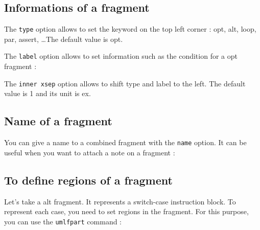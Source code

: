 \documentclass[a4paper,11pt]{report}
\newcommand{\inputTikZ}[1]{%
  }%
\newcommand{\inputTikZ}[1]{%
    \texttt{[image: fig/\#1.pdf]}%
  }%
\begin{document}
\subsection{Informations of a fragment}\label{ss.fraginfos}

The {\tt type} option allows to set the keyword on the top left corner : opt, alt, loop, par, assert, \ldots The default value is opt.

The {\tt label} option allows to set information such as the condition for a opt fragment :

\medskip

\begin{minipage}{0.5\textwidth}

\end{minipage}
\begin{minipage}{0.5\textwidth}
\begin{center}
\inputTikZ{fragmentlabel}
\end{center}
\end{minipage}

\medskip

The {\tt inner xsep} option allows to shift type and label to the left. The default value is 1 and its unit is ex.

\subsection{Name of a fragment}\label{ss.fragname}

You can give a name to a combined fragment with the {\tt name} option. It can be useful when you want to attach a note on a fragment :

\medskip

\begin{minipage}{0.5\textwidth}

\end{minipage}
\begin{minipage}{0.5\textwidth}
\begin{center}
\inputTikZ{fragmentname}
\end{center}
\end{minipage}

\subsection{To define regions of a fragment}\label{ss.fragpart}

Let's take a alt fragment. It represents a switch-case instruction block. To represent each case, you need to set regions in the fragment. For this purpose, you can use the {\tt umlfpart} command :
\end{document}
